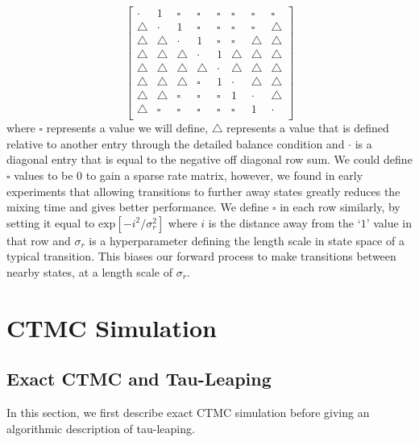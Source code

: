 \documentclass{article}
\begin{document}
\newcommand{\syma}{\square}
\newcommand{\symb}{\triangle}
\newcommand{\symc}{\cdot}
\begin{equation}
    \begin{bmatrix}
        \symc&1&\syma&\syma&\syma&\syma&\syma&\syma\\
        \symb&\symc&1&\syma&\syma&\syma&\syma&\symb\\
        \symb&\symb&\symc&1&\syma&\syma&\symb&\symb\\
        \symb&\symb&\symb&\symc&1&\symb&\symb&\symb\\
        \symb&\symb&\symb&\symb&\symc&\symb&\symb&\symb\\
        \symb&\symb&\symb&\syma&1&\symc&\symb&\symb\\
        \symb&\symb&\syma&\syma&\syma&1&\symc&\symb\\
        \symb&\syma&\syma&\syma&\syma&\syma&1&\symc\\
    \end{bmatrix}
\end{equation}
where $\syma$ represents a value we will define, $\symb$ represents a value that is defined relative to another entry through the detailed balance condition and $\symc$ is a diagonal entry that is equal to the negative off diagonal row sum. We could define $\syma$ values to be 0 to gain a sparse rate matrix, however, we found in early experiments that allowing transitions to further away states greatly reduces the mixing time and gives better performance. We define $\syma$ in each row similarly, by setting it equal to $\text{exp}[- i^2 / \sigma_r^2 ]$ where $i$ is the distance away from the `$1$' value in that row and $\sigma_r$ is a hyperparameter defining the length scale in state space of a typical transition. This biases our forward process to make transitions between nearby states, at a length scale of $\sigma_r$.






















\section{CTMC Simulation} \label{sec:ApdxCTMCSimulation}
\subsection{Exact CTMC and Tau-Leaping}
In this section, we first describe exact CTMC simulation before giving an algorithmic description of tau-leaping.\\
\end{document}
